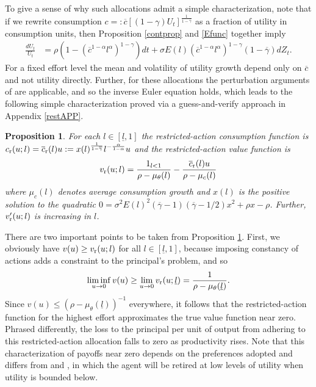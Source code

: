 \documentclass[11pt]{article}
\theoremstyle{plain}
\newtheorem{prop}[thm]{Proposition}
\begin{document}
To give a sense of why such allocations admit a simple characterization, note that if we rewrite consumption $c =: \overline{c}[(1-\gamma)U_t]^{\frac{1}{1-\overline{\gamma}}}$ as a fraction of utility in consumption units, then Proposition \ref{contprop} and \eqref{Efunc} together imply
\begin{align*}
\frac{dU_t}{U_t} & = \rho{\left(1-(\overline{c}^{1-\alpha}l^{\alpha})^{1-\gamma}\right)}dt + \sigma E(l)(\overline{c}^{1-\alpha}l^{\alpha})^{1-\gamma}(1-\overline{\gamma})dZ_t.
\end{align*} 
For a fixed effort level the mean and volatility of utility growth depend only on $\overline{c}$ and not utility directly. Further, for these allocations the perturbation arguments of \cite{golosov_optimal_2003} are applicable, and so the inverse Euler equation holds, which leads to the following simple characterization proved via a guess-and-verify approach in Appendix \ref{restAPP}.
\begin{prop}\label{propREST}
For each $l \in [\underline{l},1]$ the restricted-action consumption function is $c_{\textnormal{r}}(u;l) = \overline{c}_{\textnormal{r}}(l) u := x(l)^{\frac{1}{1-\overline{\gamma}}}l^{-\frac{\alpha }{1-\alpha}}u$ and the restricted-action value function is
$$
v_{\textnormal{r}}(u;l) = \frac{1_{l<1}}{\rho - \mu_{\theta}(l)} - \frac{\overline{c}_{\textnormal{r}}(l) u}{\rho - \mu_c(l)}
$$
where $\mu_c(l)$ denotes average consumption growth and $x(l)$ is the positive solution to the quadratic $0 = \sigma^2E(l)^2(\overline{\gamma}-1)(\overline{\gamma}-1/2)x^2 + \rho x - \rho$. Further, $v_{\textnormal{r}}'(u;l)$ is increasing in $l$. 
\end{prop} 
There are two important points to be taken from Proposition \ref{propREST}. First, we obviously have $v(u) \geq v_{\textnormal{r}}(u;l)$ for all $l \in [\underline{l},1]$, because imposing constancy of actions adds a constraint to the principal's problem, and so 
$$
\liminf_{u \rightarrow 0} v(u) \geq \lim_{u \rightarrow 0} v_{\textnormal{r}}(u;\underline{l}) = \frac{1}{\rho - \mu_{\theta}(\underline{l})}.
$$
Since $v(u) \leq (\rho - \mu_{\theta}(\underline{l}))^{-1}$ everywhere, it follows that the restricted-action function for the highest effort approximates the true value function near zero. Phrased differently, the loss to the principal per unit of output from adhering to this restricted-action allocation falls to zero as productivity rises. Note that this characterization of payoffs near zero depends on the preferences adopted and differs from \cite{phelan_computing_1991} and \cite{sannikov_continuous-time_2008}, in which the agent will be retired at low levels of utility when utility is bounded below. 
\end{document}
